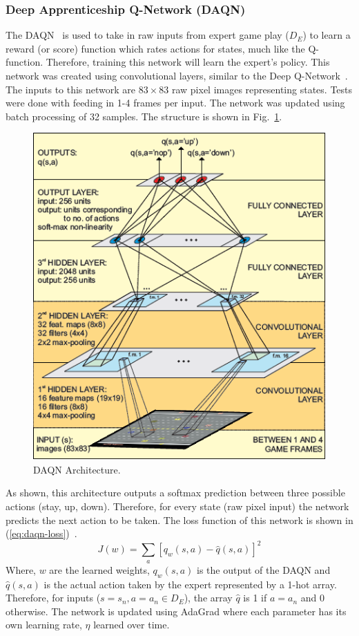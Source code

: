 \documentclass[12pt,american]{report}
\begin{document}
\subsubsection{Deep Apprenticeship Q-Network (DAQN)}
The DAQN~\cite{markovikj2014deep} is used to take in raw inputs from expert game play ($D_E$) to learn a reward (or score) function which rates actions for states, much like the Q-function. Therefore, training this network will learn the expert's policy. This network was created using convolutional layers, similar to the Deep Q-Network~\cite{atari}. The inputs to this network are $83\times 83$ raw pixel images representing states.  Tests were done with feeding in 1-4 frames per input. The network was updated using batch processing of 32 samples. The structure is shown in Fig.~\ref{fig:daqn-dal}.
\begin{figure}
\centering
\includegraphics[scale=1.5]{images/daqn-dal.png}
\caption{DAQN Architecture.~\cite{markovikj2014deep}}
\label{fig:daqn-dal}
\end{figure}
As shown, this architecture outputs a softmax prediction between three possible actions (stay, up, down).  Therefore, for every state (raw pixel input) the network predicts the next action to be taken. The loss function of this network is shown in (\ref{eq:daqn-loss})~\cite{markovikj2014deep}.
\begin{equation}
     \label{eq:daqn-loss}
     J(w) =\sum_{a}[q_w(s,a)-\hat{q}(s,a)]^2%
\end{equation}
Where, $w$ are the learned weights, $q_w(s,a)$ is the output of the DAQN and $\hat{q}(s,a)$ is the actual action taken by the expert represented by a 1-hot array.  Therefore, for inputs ($s=s_n,a=a_n \in D_E$), the array $\hat{q}$ is 1 if $a = a_n$ and 0 otherwise. The network is updated using AdaGrad where each parameter has its own learning rate, $\eta$ learned over time.
\end{document}
